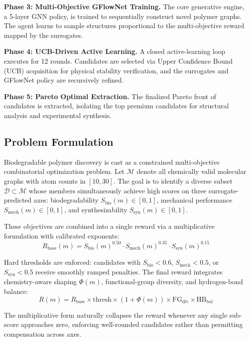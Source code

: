 \documentclass[twocolumn,10pt]{article}
\begin{document}
\textbf{Phase 3: Multi-Objective GFlowNet Training.} The core generative engine, a 5-layer GNN policy, is trained to sequentially construct novel polymer graphs. The agent learns to sample structures proportional to the multi-objective reward mapped by the surrogates.

\textbf{Phase 4: UCB-Driven Active Learning.} A closed active-learning loop executes for 12 rounds. Candidates are selected via Upper Confidence Bound (UCB) acquisition for physical stability verification, and the surrogates and GFlowNet policy are recursively refined.

\textbf{Phase 5: Pareto Optimal Extraction.} The finalized Pareto front of candidates is extracted, isolating the top premium candidates for structural analysis and experimental synthesis.

\subsection{Problem Formulation}

Biodegradable polymer discovery is cast as a constrained multi-objective combinatorial optimization problem. Let $\mathcal{M}$ denote all chemically valid molecular graphs with atom counts in $[10, 30]$. The goal is to identify a diverse subset $\mathcal{D} \subset \mathcal{M}$ whose members simultaneously achieve high scores on three surrogate-predicted axes: biodegradability $S_\text{bio}(m) \in [0,1]$, mechanical performance $S_\text{mech}(m) \in [0,1]$, and synthesizability $S_\text{syn}(m) \in [0,1]$.

These objectives are combined into a single reward via a multiplicative formulation with calibrated exponents:
\begin{equation}
R_\text{base}(m) = S_\text{bio}(m)^{0.50} \cdot S_\text{mech}(m)^{0.35} \cdot S_\text{syn}(m)^{0.15}
\label{eq:reward_base}
\end{equation}

Hard thresholds are enforced: candidates with $S_\text{bio} < 0.6$, $S_\text{mech} < 0.5$, or $S_\text{syn} < 0.5$ receive smoothly ramped penalties. The final reward integrates chemistry-aware shaping $\Phi(m)$, functional-group diversity, and hydrogen-bond balance:
\begin{equation}
R(m) = R_\text{base} \times \text{thresh} \times (1 + \Phi(m)) \times \text{FG}_{\text{div}} \times \text{HB}_{\text{bal}}
\label{eq:reward}
\end{equation}

The multiplicative form naturally collapses the reward whenever any single sub-score approaches zero, enforcing well-rounded candidates rather than permitting compensation across axes.
\end{document}
